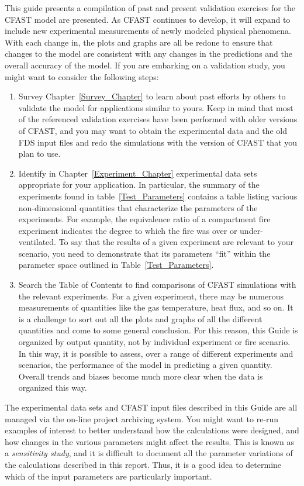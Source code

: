  This guide presents a compilation of past and present validation exercises for the CFAST model are presented.  As CFAST continues to develop, it will expand to include new experimental
measurements of newly modeled physical phenomena. With each change in,
the plots and graphs are all be redone to ensure that changes to the model are consistent with any changes in the predictions and the overall accuracy of the model. If you are embarking on a validation study, you might want to consider the following steps:
\begin{enumerate}
\item Survey Chapter~\ref{Survey_Chapter} to learn about past efforts by others to validate the model for
applications similar to yours. Keep in mind that most of the referenced validation exercises have been performed with
older versions of CFAST, and you may want to obtain the experimental data and the old FDS input files and redo the
simulations with the version of CFAST that you plan to use.
\item Identify in Chapter~\ref{Experiment_Chapter} experimental data sets appropriate for your application. In particular,
the summary of the experiments found in table~\ref{Test_Parameters} contains a table listing various non-dimensional
quantities that characterize the parameters of the experiments. For example, the equivalence ratio of a compartment fire
experiment indicates the degree to which the fire was over or under-ventilated.
To say that the results of a given experiment are relevant to
your scenario, you need to demonstrate that its parameters ``fit'' within the parameter space outlined in
Table~\ref{Test_Parameters}.
\item Search the Table of Contents to find comparisons of CFAST simulations with the relevant experiments.
For a given experiment, there may be numerous measurements of quantities like the gas temperature,
heat flux, and so on.
It is a challenge to sort out all the plots and graphs of all the different quantities and come to some general conclusion.
For this reason, this Guide is organized by output quantity, not by individual experiment or fire scenario.
In this way, it is possible to assess, over a range of
different experiments and scenarios, the performance of the model in predicting a given quantity.
Overall trends and biases become much more clear when the data is organized this way.
\end{enumerate}
The experimental data sets and CFAST input files described in this Guide are all managed via the on-line project archiving system.
You might want to re-run examples of interest
to better understand how the calculations were designed, and how changes in the various parameters might affect the results.
This is known as a {\em sensitivity study},
and it is difficult to document all the parameter variations of the calculations described in this report.
Thus, it is a good idea to determine which of the input parameters are particularly important.

